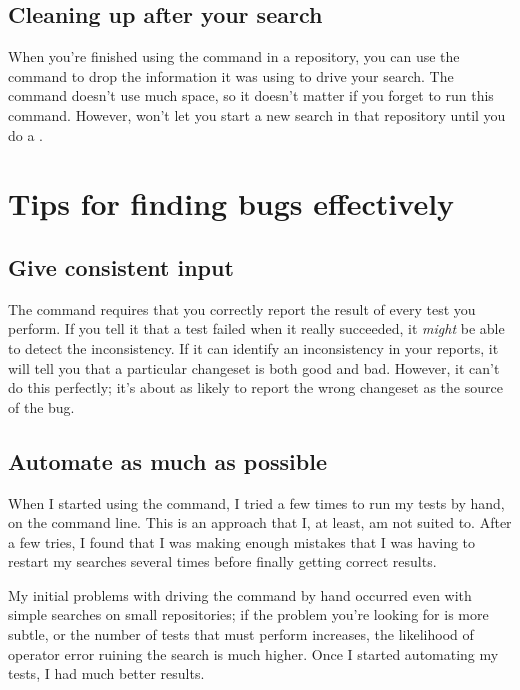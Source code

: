 \subsection{Cleaning up after your search}

When you're finished using the  command in a
repository, you can use the  command to drop
the information it was using to drive your search.  The command
doesn't use much space, so it doesn't matter if you forget to run this
command.  However,  won't let you start a new search in
that repository until you do a .

\section{Tips for finding bugs effectively}

\subsection{Give consistent input}

The  command requires that you correctly report the
result of every test you perform.  If you tell it that a test failed
when it really succeeded, it \emph{might} be able to detect the
inconsistency.  If it can identify an inconsistency in your reports,
it will tell you that a particular changeset is both good and bad.
However, it can't do this perfectly; it's about as likely to report
the wrong changeset as the source of the bug.

\subsection{Automate as much as possible}

When I started using the  command, I tried a few times
to run my tests by hand, on the command line.  This is an approach
that I, at least, am not suited to.  After a few tries, I found that I
was making enough mistakes that I was having to restart my searches
several times before finally getting correct results.

My initial problems with driving the  command by hand
occurred even with simple searches on small repositories; if the
problem you're looking for is more subtle, or the number of tests that
 must perform increases, the likelihood of operator
error ruining the search is much higher.  Once I started automating my
tests, I had much better results.

